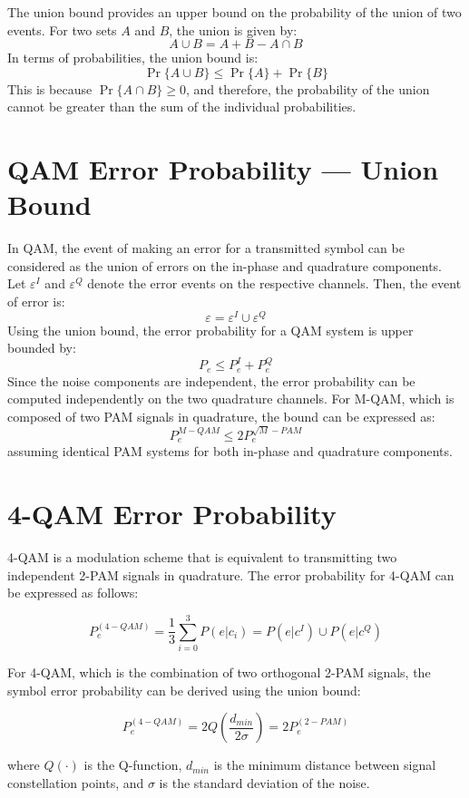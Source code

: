 The union bound provides an upper bound on the probability of the union of two events. For two sets \( A \) and \( B \), the union is given by:
\[
A \cup B = A + B - A \cap B
\]
In terms of probabilities, the union bound is:
\[
\Pr\{A \cup B\} \leq \Pr\{A\} + \Pr\{B\}
\]
This is because \( \Pr\{A \cap B\} \geq 0 \), and therefore, the probability of the union cannot be greater than the sum of the individual probabilities.

\section*{QAM Error Probability — Union Bound}

In QAM, the event of making an error for a transmitted symbol can be considered as the union of errors on the in-phase and quadrature components. Let \( \varepsilon^I \) and \( \varepsilon^Q \) denote the error events on the respective channels. Then, the event of error is:
\[
\varepsilon = \varepsilon^I \cup \varepsilon^Q
\]
Using the union bound, the error probability for a QAM system is upper bounded by:
\[
P_e \leq P_{e}^I + P_{e}^Q
\]
Since the noise components are independent, the error probability can be computed independently on the two quadrature channels. For M-QAM, which is composed of two PAM signals in quadrature, the bound can be expressed as:
\[
P_e^{M-QAM} \leq 2 P_e^{\sqrt{M}-PAM}
\]
assuming identical PAM systems for both in-phase and quadrature components.




\section*{4-QAM Error Probability}

4-QAM is a modulation scheme that is equivalent to transmitting two independent 2-PAM signals in quadrature. The error probability for 4-QAM can be expressed as follows:

\[
P_e^{(4-QAM)} = \frac{1}{3} \sum_{i=0}^{3} P(e|c_i) = P(e|c^I) \cup P(e|c^Q)
\]

For 4-QAM, which is the combination of two orthogonal 2-PAM signals, the symbol error probability can be derived using the union bound:

\[
P_e^{(4-QAM)} = 2Q\left(\frac{d_{min}}{2\sigma}\right) = 2P_e^{(2-PAM)}
\]

where \( Q(\cdot) \) is the Q-function, \( d_{min} \) is the minimum distance between signal constellation points, and \( \sigma \) is the standard deviation of the noise.

